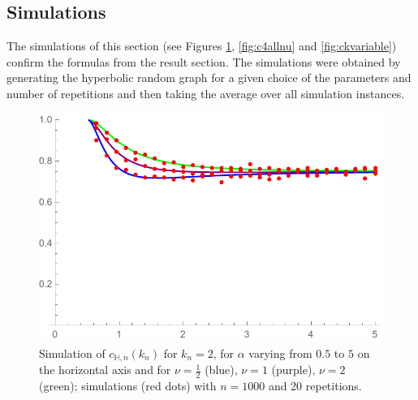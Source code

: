 



\subsection{Simulations}\label{ssec:simulations}
The simulations of this section (see Figures \ref{fig:c2allnu}, \ref{fig:c4allnu} and \ref{fig:ckvariable}) confirm the formulas from the result section. The simulations were obtained by generating the hyperbolic random graph for a given choice of the parameters and number of repetitions and then taking the average over all simulation instances.
\begin{figure}
    \centering
    \includegraphics[scale=0.6]{figures/sim0123c2nualln1000rep20.pdf}
    \caption{Simulation of $c_{\mathbb{H},n}(k_n)$ for $k_n= 2$, for $\alpha$ varying from $0.5$ to $5$ on the horizontal axis and for $\nu=\frac{1}{2}$ (blue), $\nu=1$ (purple), $\nu=2$ (green); simulations (red dots) with $n=1000$ and 20 repetitions.}
    \label{fig:c2allnu}
\end{figure}
